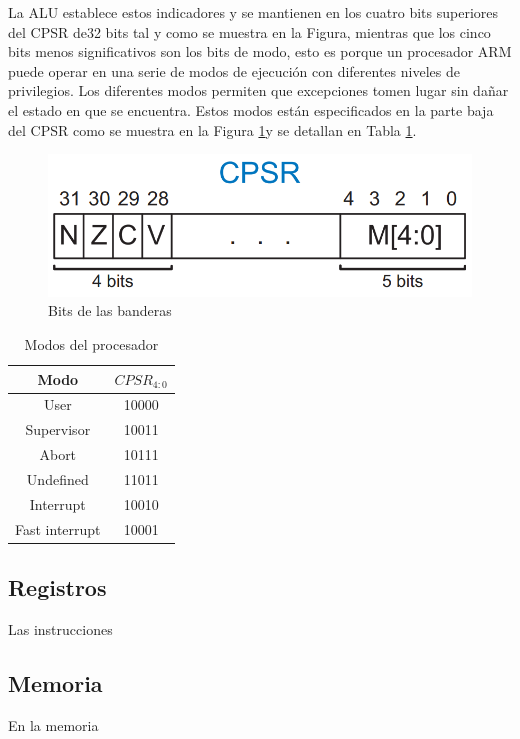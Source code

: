 \documentclass[journal,trans]{IEEEtran}
\begin{document}
	La ALU establece estos indicadores y se mantienen en los cuatro bits superiores del CPSR de32 bits tal y como se muestra en la Figura, mientras que los cinco bits menos significativos son los bits de modo, esto es porque un procesador ARM puede operar en una serie de modos de ejecución con diferentes niveles de privilegios. Los diferentes modos permiten que excepciones tomen lugar sin dañar el estado en que se encuentra. Estos modos están especificados en la parte baja del CPSR como se muestra en la Figura \ref{fig:Banderas}y se detallan en Tabla \ref{tab:Modos}.
	
	\begin{figure}[h]
		\centering
		\includegraphics[width =\linewidth]{img/CPSR.png}
		\caption{Bits de las banderas \cite{SarahLHarris2010}}
		\label{fig:Banderas}
	\end{figure}
	
	\begin{table}[h]
		\centering
		\begin{tabular}{|c|c|}
			\hline
			Modo           &  $CPSR_{4:0}$ \\
			\hline
			\hline
			User           &  10000 \\
			\hline
			Supervisor     &  10011 \\
			\hline
			Abort          &  10111 \\
			\hline
			Undefined      &  11011 \\
			\hline
			Interrupt      &  10010 \\
			\hline
			Fast interrupt &  10001 \\
			\hline
		\end{tabular}
		\caption{Modos del procesador}
		\label{tab:Modos}
	\end{table}
		
	\subsection{Registros}
	Las instrucciones 
	
	\subsection{Memoria}
	En la memoria
	
\end{document}
